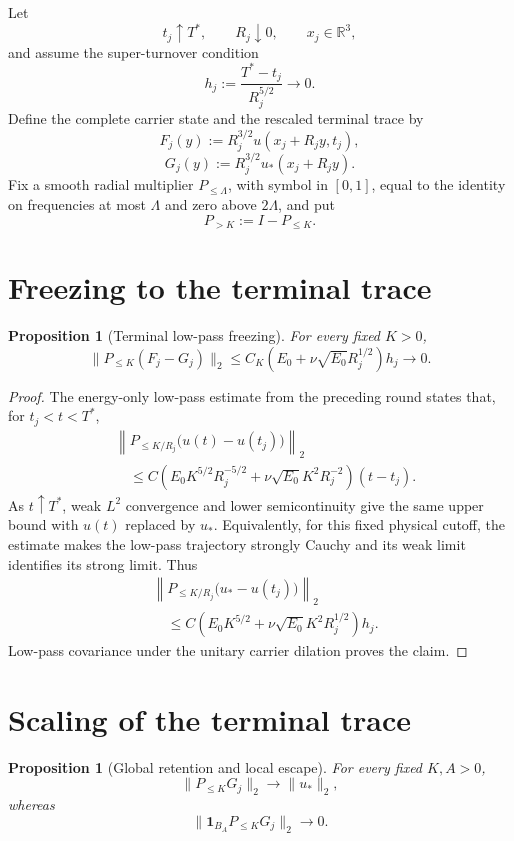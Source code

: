\documentclass[11pt]{article}
\newtheorem{proposition}[theorem]{Proposition}
\theoremstyle{remark}
\newcommand{\R}{\mathbb R}
\newcommand{\Plo}[1]{P_{\le #1}}
\newcommand{\PhiHi}[1]{P_{>#1}}
\begin{document}
Let
\[
 t_j\uparrow T^*,
 \qquad
 R_j\downarrow0,
 \qquad
 x_j\in\R^3,
\]
and assume the super-turnover condition
\[
 \boxed{
 h_j:=\frac{T^*-t_j}{R_j^{5/2}}\longrightarrow0.
 }
\]
Define the complete carrier state and the rescaled terminal trace by
\[
 F_j(y):=R_j^{3/2}u(x_j+R_jy,t_j),
\]
\[
 G_j(y):=R_j^{3/2}u_*(x_j+R_jy).
\]
Fix a smooth radial multiplier \(\Plo{\Lambda}\), with symbol in \([0,1]\),
equal to the identity on frequencies at most \(\Lambda\) and zero above
\(2\Lambda\), and put
\[
 \PhiHi K:=I-\Plo K.
\]

\section{Freezing to the terminal trace}

\begin{proposition}[Terminal low-pass freezing]
\label{prop:freezing}
For every fixed \(K>0\),
\[
 \boxed{
 \|\Plo K(F_j-G_j)\|_2
 \le
 C_K
 \left(E_0+\nu\sqrt{E_0}R_j^{1/2}\right)h_j
 \longrightarrow0.
 }
\]
\end{proposition}

\begin{proof}
The energy-only low-pass estimate from the preceding round states that, for
\(t_j<t<T^*\),
\[
\begin{aligned}
 &\left\|
 \Plo{K/R_j}\bigl(u(t)-u(t_j)\bigr)
 \right\|_2\\
 &\quad\le
 C\left(
 E_0K^{5/2}R_j^{-5/2}
 +
 \nu\sqrt{E_0}K^2R_j^{-2}
 \right)(t-t_j).
\end{aligned}
\]
As \(t\uparrow T^*\), weak \(L^2\) convergence and lower semicontinuity give
the same upper bound with \(u(t)\) replaced by \(u_*\).  Equivalently, for
this fixed physical cutoff, the estimate makes the low-pass trajectory
strongly Cauchy and its weak limit identifies its strong limit.  Thus
\[
\begin{aligned}
 &\left\|
 \Plo{K/R_j}\bigl(u_*-u(t_j)\bigr)
 \right\|_2\\
 &\quad\le
 C\left(
 E_0K^{5/2}
 +
 \nu\sqrt{E_0}K^2R_j^{1/2}
 \right)h_j.
\end{aligned}
\]
Low-pass covariance under the unitary carrier dilation proves the claim.
\end{proof}

\section{Scaling of the terminal trace}

\begin{proposition}[Global retention and local escape]
\label{prop:trace}
For every fixed \(K,A>0\),
\[
 \boxed{\|\Plo K G_j\|_2\longrightarrow\|u_*\|_2,}
\]
whereas
\[
 \boxed{
 \|\mathbf1_{B_A}\Plo K G_j\|_2\longrightarrow0.
 }
\]
\end{proposition}
\end{document}
